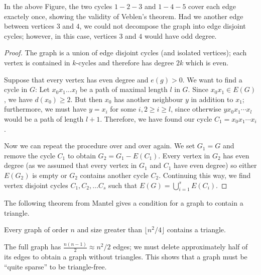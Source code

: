 In the above Figure, the two cycles $1-2-3$ and $1-4-5$ cover each edge exactely once, showing the validity of Veblen's theorem. Had we another edge between vertices $3$ and $4$, we could not decompose the graph into edge disjoint cycles; however, in this case, vertices $3$ and $4$ would have odd degree.

\begin{proof}
  The graph is a union of edge disjoint cycles (and isolated vertices); each vertex is contained in $k$-cycles and therefore has degree $2k$ which is even.

  Suppose that every vertex has even degree and $e(g) > 0$. We want to find a cycle in $G$: Let $x_0 x_1 \ldots x_l$ be a path of maximal length $l$ in $G$. Since $x_0 x_1 \in E(G)$, we have $d(x_0) \geq 2$. But then $x_0$ has another neighbour $y$ in addition to $x_1$; furthermore, we must have $y=x_i$ for some $i, 2 \geq i \geq l$, since otherwise $y x_0 x_1 \cdots x_l$ would be a path of length $l+1$. Therefore, we have found our cycle $C_1 = x_0 x_1 \cdots x_i$.

  Now we can repeat the procedure over and over again. We set $G_1 = G$ and remove the cycle $C_1$ to obtain $G_2 = G_1 - E(C_1)$. Every vertex in $G_2$ has even degree (as we assumed that every vertex in $G_1$ and $C_1$ have even degree) so either $E(G_2)$ is empty or $G_2$ contains another cycle $C_2$. Continuing this way, we find vertex disjoint cycles $C_1, C_2, \ldots C_s$ such that $E(G) = \bigcup_{i=1}^s E(C_i)$.
\end{proof}

The following theorem from Mantel gives a condition for a graph to contain a triangle.

\begin{theorem}
  Every graph of order $n$ and size greater than $\lfloor n^2/4 \rfloor$ contains a triangle.
\end{theorem}

The full graph has $\frac{n(n-1)}{2} \approx n^2 / 2$ edges; we must delete approximately half of its edges to obtain a graph without triangles. This shows that a graph must be ``quite sparse'' to be triangle-free.

